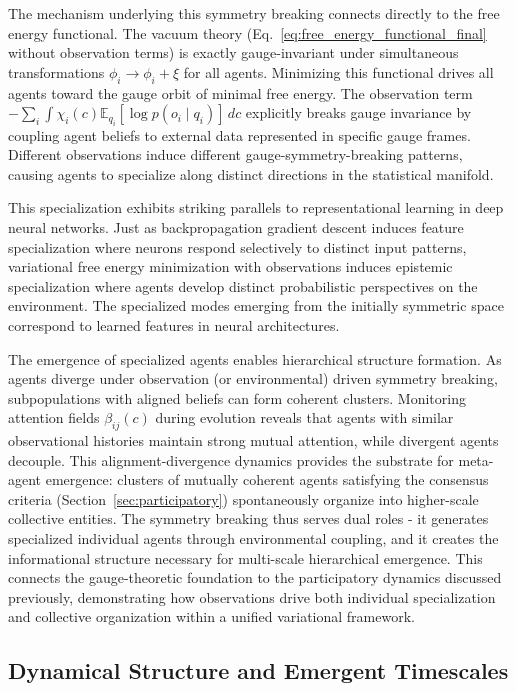 \documentclass[11pt]{article}
\begin{document}
The mechanism underlying this symmetry breaking connects directly to the free energy functional. The vacuum theory (Eq.~\ref{eq:free_energy_functional_final} without observation terms) is exactly gauge-invariant under simultaneous transformations $\phi_i \to \phi_i + \xi$ for all agents. Minimizing this functional drives all agents toward the gauge orbit of minimal free energy. The observation term $-\sum_i \int \chi_i(c) \mathbb{E}_{q_i}[\log p(o_i \mid q_i)] \, dc$ explicitly breaks gauge invariance by coupling agent beliefs to external data represented in specific gauge frames. Different observations induce different gauge-symmetry-breaking patterns, causing agents to specialize along distinct directions in the statistical manifold.

This specialization exhibits striking parallels to representational learning in deep neural networks. Just as backpropagation gradient descent induces feature specialization where neurons respond selectively to distinct input patterns, variational free energy minimization with observations induces epistemic specialization where agents develop distinct probabilistic perspectives on the environment. The specialized modes emerging from the initially symmetric space correspond to learned features in neural architectures. 

The emergence of specialized agents enables hierarchical structure formation. As agents diverge under observation (or environmental) driven symmetry breaking, subpopulations with aligned beliefs can form coherent clusters. Monitoring attention fields $\beta_{ij}(c)$ during evolution reveals that agents with similar observational histories maintain strong mutual attention, while divergent agents decouple. This alignment-divergence dynamics provides the substrate for meta-agent emergence: clusters of mutually coherent agents satisfying the consensus criteria (Section~\ref{sec:participatory}) spontaneously organize into higher-scale collective entities. The symmetry breaking thus serves dual roles - it generates specialized individual agents through environmental coupling, and it creates the informational structure necessary for multi-scale hierarchical emergence. This connects the gauge-theoretic foundation to the participatory dynamics discussed previously, demonstrating how observations drive both individual specialization and collective organization within a unified variational framework.

\subsection{Dynamical Structure and Emergent Timescales}
\end{document}
